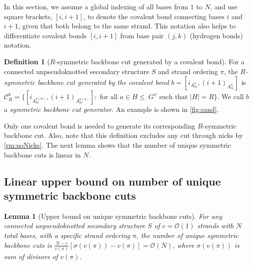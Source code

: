 \documentclass[11pt,letterpaper]{article}  \usepackage[margin=1in]{geometry}
\newtheorem{lemma}[theorem]{Lemma}
\theoremstyle{definition}  \newtheorem{Definition}[theorem]{Definition}
\begin{document}
\begin{remark}\label{rm:noNicks}
	In this section, we assume a global indexing of all bases from $1$ to $N$, and use square brackets, $[i, i+1]$, to  denote the covalent bond connecting bases $i$ and $i +1$, given that both belong to the same strand. This notation also helps to differentiate covalent bonds $[i, i+1]$ from base pair $(j,k)$ (hydrogen bonds)  notation. 
\end{remark}

\begin{Definition}[$R$-symmetric backbone cut generated by a covalent bond]\label{def:cut}
	For  a connected unpseudoknotted secondary structure $S$ and strand ordering $\pi$, the {\em $R$-symmetric backbone cut generated by the covalent bond} $b=[i_{A_m^n}, (i+1)_{A_m^n}]$ is $\mathcal{C}_R^b = \{ [i_{A_m^{a(n)}}, ({i+1})_{A_{m}^{a(n)}}]: \textrm{ for all } a \in H \!\!\leq \!\! \!\ G^\pi \textrm{ such that } |H| = R \}$. We call $b$ a {\em symmetric backbone cut generator}. An example is shown in \cref{fig:sand}.
\end{Definition}


Only one covalent bond is needed to generate its corresponding $R$-symmetric backbone cut. Also, note that this definition excludes any cut through nicks by \cref{rm:noNicks}. The next lemma shows that the number of unique symmetric backbone cuts is linear in $N$.

\subsection{Linear upper bound on number of unique symmetric backbone cuts}

\begin{lemma}[Upper bound on unique symmetric backbone cuts]\label{lem:ub}
	For any connected unpseudoknotted secondary structure $S$ of $c=\mathcal{O}(1)$ strands with $N$ total bases, with a specific strand ordering $\pi$, the number of  unique symmetric backbone cuts is $\frac{N-c}{v(\pi)} \left[ \sigma(v(\pi))-v(\pi) \right] = \mathcal{O}(N)$, where $\sigma(v(\pi))$ is sum of divisors of $v(\pi)$. 
\end{lemma}
\end{document}
